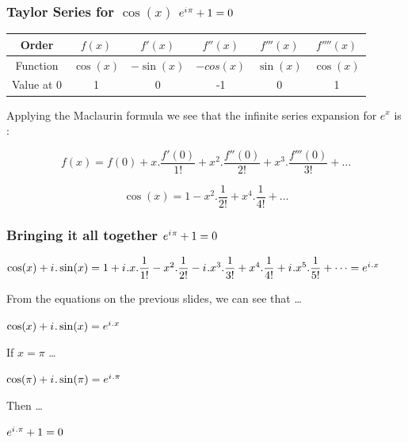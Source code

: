\documentclass[10pt]{beamer}
\newcommand{\iu}{{i\mkern1mu}}
\begin{document}
\begin{frame}
	\frametitle{Taylor Series for $\cos(x)$ \hspace{25pt} \textcolor{pink}{\Huge\(e^{\iu \pi} +1 = 0\)}}
	\begin{center}
		\begin{tabular}{|c|c|c|c|c|c|}
			\hline
			Order & $f(x)$    & $f'(x)$    & $f''(x)$  & $f'''(x)$ & $f''''(x)$ \\
			\hline
			Function & $\cos(x)$ & $-\sin(x)$ & $-cos(x)$ & $\sin(x)$ & $\cos(x)$  \\
			\hline
			Value at 0 & 1         & 0          & -1        & 0         & 1          \\
			\hline
		\end{tabular}
	\end{center}
	\vspace{20pt}
	Applying the Maclaurin formula we see that the infinite series expansion for $e^x$ is :

	\large $$f(x) = f(0)+x.\dfrac{f'(0)}{1!}+ x^2.\dfrac{f''(0)}{2!} +x^3.\dfrac{f'''(0)}{3!} + \dots$$

	\large $$\cos(x) = 1- x^2.\dfrac{1}{2!} +x^4.\dfrac{1}{4!} + \dots$$

\end{frame}

\begin{frame}
	\frametitle{Bringing it all together \hspace{25pt} \textcolor{pink}{\Huge\(e^{\iu \pi} +1 = 0\)}}
	\begin{center}
	$\cos(x) + \iu.\sin(x) = 1+\iu.x.\dfrac{1}{1!}- x^2.\dfrac{1}{2!} -\iu.x^3.\dfrac{1}{3!} +x^4.\dfrac{1}{4!} + \iu.x^5.\dfrac{1}{5!} +\dots = e^{\iu.x}$
	\end{center}

	From the equations on the previous slides, we can see that \dots
	\begin{center}
		$\cos(x) + \iu.\sin(x) = e^{\iu.x}$ 
	\end{center} 
	If $x = \pi$ \dots
	\begin{center}
		$\cos(\pi) + \iu.\sin(\pi) = e^{\iu.\pi}$ \\
	\end{center}
	Then \dots
	\begin{center}
		$e^{\iu.\pi} + 1 = 0$
	\end{center}
\end{frame}
\end{document}

